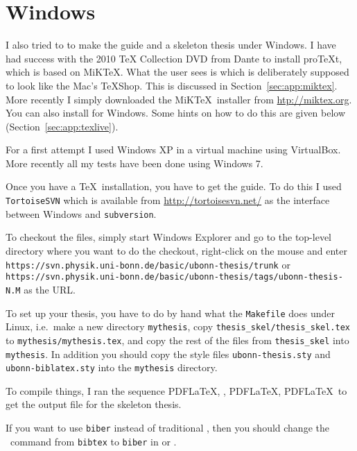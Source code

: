 \section{Windows}
\label{sec:app:windows}

I also tried to to make the guide and a skeleton thesis under
Windows. I have had success with the 2010 \TeX{} Collection DVD from Dante to install
pro\TeX t, which is based on MiK\TeX. 
What the user sees is \TeXworks
which is deliberately supposed to look like the Mac's \TeX Shop. This
is discussed in Section~\ref{sec:app:miktex}.
More recently I simply downloaded the MiK\TeX\ installer from
\url{htp://miktex.org}.
You can also install \TeXLive for Windows. Some hints on how to do
this are given below (Section~\ref{sec:app:texlive}).

For a first attempt I used Windows XP in a virtual machine using
VirtualBox. More recently all my tests have been done using Windows 7.

Once you have a \TeX\ installation, you have to get the guide. To do
this I used \texttt{TortoiseSVN} which is available from
\url{http://tortoisesvn.net/} as the interface between Windows and
\texttt{subversion}.

To checkout the files, simply start Windows Explorer and go to the
top-level directory where you want to do the checkout, right-click on
the mouse and enter\\
\texttt{https://svn.physik.uni-bonn.de/basic/ubonn-thesis/trunk} or\\
\texttt{https://svn.physik.uni-bonn.de/basic/ubonn-thesis/tags/ubonn-thesis-N.M}
as the URL.

To set up your thesis, you have to do by hand what the
\texttt{Makefile} does under Linux, i.e.\ make a new directory
\texttt{mythesis}, copy \texttt{thesis\_skel/thesis\_skel.tex} to
\texttt{mythesis/mythesis.tex}, and copy the rest of the files from
\texttt{thesis\_skel} into \texttt{mythesis}. In addition you should
copy the style files \texttt{ubonn-thesis.sty} and \texttt{ubonn-biblatex.sty} into the
\texttt{mythesis} directory.

To compile things, I ran the sequence PDF\LaTeX, \BibTeX, PDF\LaTeX,
PDF\LaTeX\ to get the output file for the skeleton thesis.

If you want to use \texttt{biber} instead of traditional \BibTeX, then you should
change the \BibTeX\ command from \texttt{bibtex} to \texttt{biber} in
\TeXstudio or \TeXworks.

